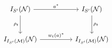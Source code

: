 \[\begin{tikzcd}[column sep=huge,row sep=large]
I_{S'}(\mathcal N) \arrow[r,"a^*"] \arrow[d,"\rho_t"'] & I_{S'}(\mathcal N) \arrow[d,"\rho_t"]\\
I_{I_{S'}(\mathcal M)}(\mathcal N) \arrow[r,"w_t(a)^*"] & I_{I_{S'}(\mathcal M)}(\mathcal N)
\end{tikzcd}\]
